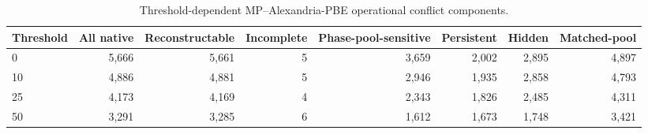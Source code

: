 \begin{table}[H]
\centering
\sitablefont
\caption{Threshold-dependent MP--Alexandria-PBE operational conflict components.}
\label{tab:v3-common}
\begin{adjustbox}{max width=\linewidth}
\begin{tabular}{@{}lrrrrrrr@{}}
\toprule
Threshold & All native & Reconstructable & Incomplete & Phase-pool-sensitive & Persistent & Hidden & Matched-pool \\
\midrule
0 & 5,666 & 5,661 & 5 & 3,659 & 2,002 & 2,895 & 4,897 \\
10 & 4,886 & 4,881 & 5 & 2,946 & 1,935 & 2,858 & 4,793 \\
25 & 4,173 & 4,169 & 4 & 2,343 & 1,826 & 2,485 & 4,311 \\
50 & 3,291 & 3,285 & 6 & 1,612 & 1,673 & 1,748 & 3,421 \\
\bottomrule
\end{tabular}
\end{adjustbox}
\end{table}


